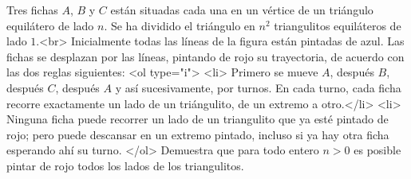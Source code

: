 Tres fichas $A$, $B$ y $C$ están situadas cada una en un vértice de un triángulo equilátero de lado $n$. Se ha dividido el triángulo en $n^2$ triangulitos equiláteros de lado $1$.<br>
Inicialmente todas las líneas de la figura están pintadas de azul. Las fichas se desplazan por las líneas, pintando de rojo su trayectoria, de acuerdo con las dos reglas siguientes:
<ol type="i">
  <li> Primero se mueve $A$, después $B$, después $C$, después $A$ y así sucesivamente, por turnos. En cada turno, cada ficha recorre exactamente un lado de un triángulito, de un extremo a otro.</li>
  <li> Ninguna ficha puede recorrer un lado de un triangulito que ya esté pintado de rojo; pero puede descansar en un extremo pintado, incluso si ya hay otra ficha esperando ahí su turno.
</ol>
Demuestra que para todo entero $n>0$ es posible pintar de rojo todos los lados de los triangulitos.
